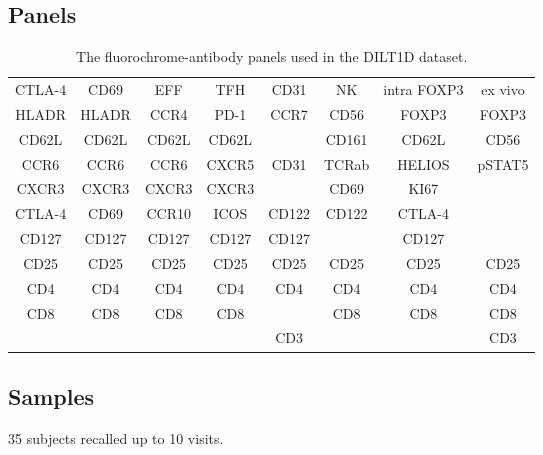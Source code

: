 
\subsection{Panels}

\begin{table}[h!]\footnotesize
\begin{tabularx}{\textwidth}{cccccccc}
\rowcolor{Gray} 
CTLA-4 & CD69  & EFF   & TFH   & CD31  & NK    & intra FOXP3 & ex vivo \\
HLADR  & HLADR & CCR4  & PD-1  & CCR7  & CD56  & FOXP3       & FOXP3 \\
CD62L  & CD62L & CD62L & CD62L &       & CD161 & CD62L       & CD56 \\
CCR6   & CCR6  & CCR6  & CXCR5 & CD31  & TCRab & HELIOS      & pSTAT5 \\
CXCR3  & CXCR3 & CXCR3 & CXCR3 &       & CD69  & KI67        & \\
CTLA-4 & CD69  & CCR10 & ICOS  & CD122 & CD122 & CTLA-4      & \\
CD127  & CD127 & CD127 & CD127 & CD127 &       & CD127       & \\
CD25   & CD25  & CD25  & CD25  & CD25  & CD25  & CD25        & CD25 \\
CD4    & CD4   & CD4   & CD4   & CD4   & CD4   & CD4         & CD4 \\
CD8    & CD8   & CD8   & CD8   &       & CD8   & CD8         & CD8 \\
       &       &       &       & CD3   &       &             & CD3 \\
\end{tabularx}
\caption{ \label{DILT1D-panels}
The fluorochrome-antibody panels used in the DILT1D dataset.
}
\end{table}


\subsection{Samples}

35 subjects recalled up to 10 visits.

